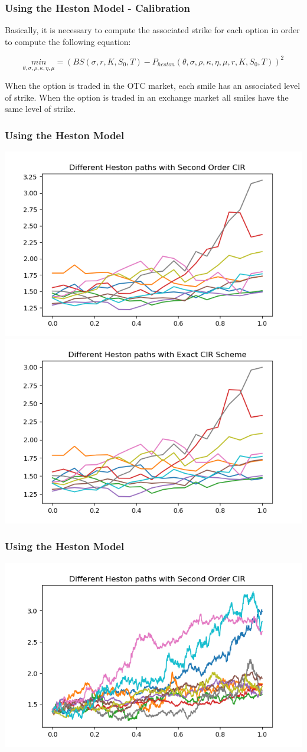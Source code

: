 \documentclass[12pt]{beamer}
\begin{document}
\begin{frame}
\frametitle{Using the Heston Model - Calibration}
Basically, it is necessary to compute the associated strike for each option in order to compute the following equation:

$$\underset{\theta,\sigma,\rho,\kappa,\eta,\mu}{min}=(BS(\sigma,r,K,S_{0},T)-P_{heston}(\theta,\sigma,\rho,\kappa,\eta,\mu,r,K,S_{0},T))^2$$

When the option is traded in the OTC market, each smile has an associated level of strike. When the option is traded in an exchange market all smiles have the same level of strike.
\end{frame}

\begin{frame}
\frametitle{Using the Heston Model}
\includegraphics[width=.5\textwidth]{heston_cir220.png}
\includegraphics[width=.5\textwidth]{heston_exact20.png}
\end{frame}

\begin{frame}
\frametitle{Using the Heston Model}
\includegraphics[width=\textwidth]{heston_cir21000.png}
\end{frame}
\end{document}

